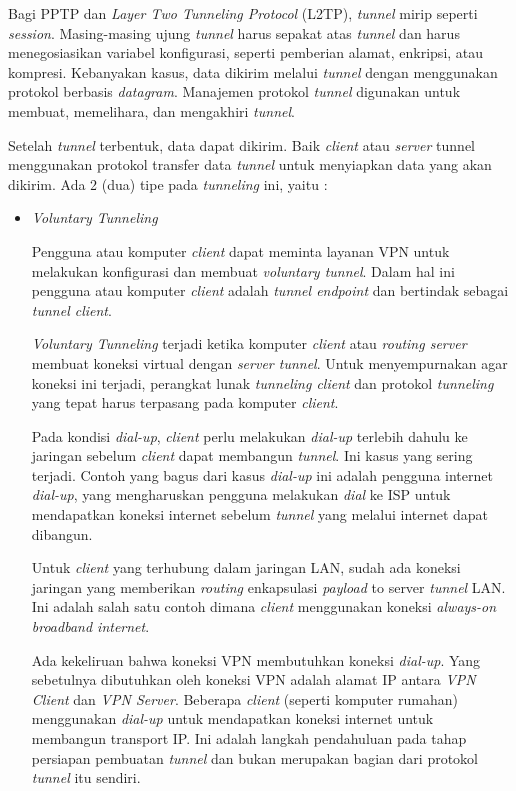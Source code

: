 \documentclass[pdftex,12pt, oneside]{article}
\begin{document}
\begin{enumerate}
\begin{enumerate}
  Bagi PPTP dan \textit{Layer Two Tunneling Protocol} (L2TP), \textit{tunnel} mirip seperti \textit{session}. Masing-masing ujung \textit{tunnel} harus sepakat atas \textit{tunnel} dan harus menegosiasikan variabel konfigurasi, seperti pemberian alamat, enkripsi, atau kompresi. Kebanyakan kasus, data dikirim melalui \textit{tunnel} dengan menggunakan protokol berbasis \textit{datagram}. Manajemen protokol \textit{tunnel} digunakan untuk membuat, memelihara, dan mengakhiri \textit{tunnel}.
  
  Setelah \textit{tunnel} terbentuk, data dapat dikirim. Baik \textit{client} atau \textit{server} tunnel menggunakan protokol transfer data \textit{tunnel} untuk menyiapkan data yang akan dikirim. Ada 2 (dua) tipe pada \textit{tunneling} ini, yaitu :
  
  \begin{itemize}
    \item \textit{Voluntary Tunneling}
    
    Pengguna atau komputer \textit{client} dapat meminta layanan VPN untuk melakukan konfigurasi dan membuat \textit{voluntary tunnel}. Dalam hal ini pengguna atau komputer \textit{client} adalah \textit{tunnel endpoint} dan bertindak sebagai \textit{tunnel client}.
    
    \textit{Voluntary Tunneling} terjadi ketika komputer \textit{client} atau \textit{routing server} membuat koneksi virtual dengan \textit{server tunnel}. Untuk menyempurnakan agar koneksi ini terjadi, perangkat lunak \textit{tunneling client} dan protokol \textit{tunneling} yang tepat harus terpasang pada komputer \textit{client}.
    
    Pada kondisi \textit{dial-up}, \textit{client} perlu melakukan \textit{dial-up} terlebih dahulu ke jaringan sebelum \textit{client} dapat membangun \textit{tunnel}. Ini kasus yang sering terjadi. Contoh yang bagus dari kasus \textit{dial-up} ini adalah pengguna internet \textit{dial-up}, yang mengharuskan pengguna melakukan \textit{dial} ke ISP untuk mendapatkan koneksi internet sebelum \textit{tunnel} yang melalui internet dapat dibangun.
    
    Untuk \textit{client} yang terhubung dalam jaringan LAN, sudah ada koneksi jaringan yang memberikan \textit{routing} enkapsulasi \textit{payload} to server \textit{tunnel} LAN. Ini adalah salah satu contoh dimana \textit{client} menggunakan koneksi \textit{always-on broadband internet}.
    
    Ada kekeliruan bahwa koneksi VPN membutuhkan koneksi \textit{dial-up}. Yang sebetulnya dibutuhkan oleh koneksi VPN adalah alamat IP antara \textit{VPN Client} dan \textit{VPN Server}. Beberapa \textit{client} (seperti komputer rumahan) menggunakan \textit{dial-up} untuk mendapatkan koneksi internet untuk membangun transport IP. Ini adalah langkah pendahuluan pada tahap persiapan pembuatan \textit{tunnel} dan bukan merupakan bagian dari protokol \textit{tunnel} itu sendiri.
    

\end{itemize}
\end{enumerate}
\end{enumerate}
\end{document}
